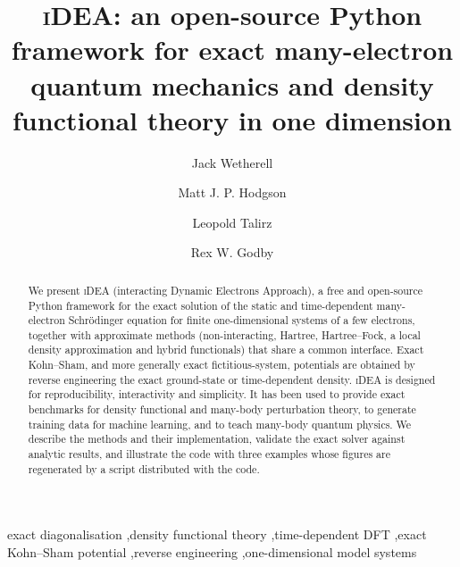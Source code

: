 \documentclass[5p,times,twocolumn]{elsarticle}
\newcommand{\iDEA}{\textsc{iDEA}}
\begin{document}
\begin{frontmatter}

\title{\iDEA: an open-source Python framework for exact many-electron quantum mechanics and density functional theory in one dimension}

\author[york]{Jack Wetherell}
\author[york]{Matt J. P. Hodgson}
\author[york]{Leopold Talirz}
\author[york]{Rex W. Godby}
\address[york]{Department of Physics and York Centre for Quantum Technologies, University of York, York YO10 5DD, United Kingdom}

\begin{abstract}
We present \iDEA{} (interacting Dynamic Electrons Approach), a free and open-source Python framework for the exact solution of the static and time-dependent many-electron Schr\"odinger equation for finite one-dimensional systems of a few electrons, together with approximate methods (non-interacting, Hartree, Hartree--Fock, a local density approximation and hybrid functionals) that share a common interface. Exact Kohn--Sham, and more generally exact fictitious-system, potentials are obtained by reverse engineering the exact ground-state or time-dependent density. \iDEA{} is designed for reproducibility, interactivity and simplicity. It has been used to provide exact benchmarks for density functional and many-body perturbation theory, to generate training data for machine learning, and to teach many-body quantum physics. We describe the methods and their implementation, validate the exact solver against analytic results, and illustrate the code with three examples whose figures are regenerated by a script distributed with the code.
\end{abstract}

\begin{keyword}
exact diagonalisation \sep density functional theory \sep time-dependent DFT \sep exact Kohn--Sham potential \sep reverse engineering \sep one-dimensional model systems
\end{keyword}

\end{frontmatter}

\end{document}
